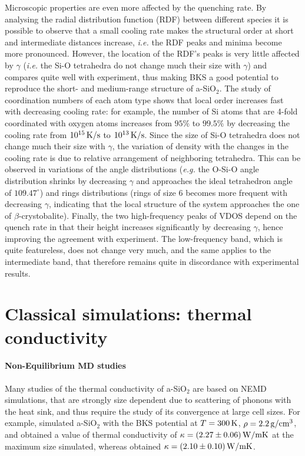 Microscopic properties are even more affected by the quenching rate. 
By analysing the radial distribution function (RDF) between different species it is possible to observe that a small cooling rate makes the structural order at short and intermediate distances increase, \emph{i.e.} the RDF peaks and minima become more pronounced. However, the location of the RDF's peaks is very little affected by $\gamma$ (\emph{i.e.} the Si-O tetrahedra do not change much their size with $\gamma$) and compares quite well with experiment, thus making BKS a good potential to reproduce the short- and medium-range structure of a-SiO$_2$. 
The study of coordination numbers of each atom type shows that local order increases fast with decreasing cooling rate: for example, the number of Si atoms that are 4-fold coordinated with oxygen atoms increases from $95\%$ to $99.5\%$ by decreasing the cooling rate from $10^{15}\,\mathrm{K/s}$ to $10^{13}\,\mathrm{K/s}$.
Since the size of Si-O tetrahedra does not change much their size with $\gamma$, the variation of density with the changes in the cooling rate is due to relative arrangement of neighboring tetrahedra. This can be observed in variations of the angle distributions (\emph{e.g.} the O-Si-O angle distribution shrinks by decreasing $\gamma$ and approaches the ideal tetrahedron angle of $109.47^\circ$) and rings distributions (rings of size $6$ becomes more frequent with decreasing $\gamma$, indicating that the local structure of the system approaches the one of $\beta$-crystobalite). 
Finally, the two high-frequency peaks of VDOS depend on the quench rate in that their height increases significantly by decreasing $\gamma$, hence improving the agreement with experiment. The low-frequency band, which is quite featureless, does not change very much, and the same applies to the intermediate band, that therefore remains quite in discordance with experimental results. 

\section{Classical simulations: thermal conductivity}

\paragraph{Non-Equilibrium MD studies}
Many studies of the thermal conductivity of a-SiO$_2$ are based on NEMD simulations, that are strongly size dependent due to scattering of phonons with the heat sink, and thus require the study of its convergence at large cell sizes. 
For example, \citet{Tian2017} simulated a-SiO$_2$ with the BKS potential at $T=300\,\mathrm{K}$, $\rho=2.2\,\mathrm{g/cm^3}$, and obtained a value of thermal conductivity of $\kappa=(2.27 \pm 0.06)\,\mathrm{W/mK}$ at the maximum size simulated, whereas \citet{Coquil2011} obtained $\kappa= (2.10 \pm 0.10)\,\mathrm{W/mK}$. 

